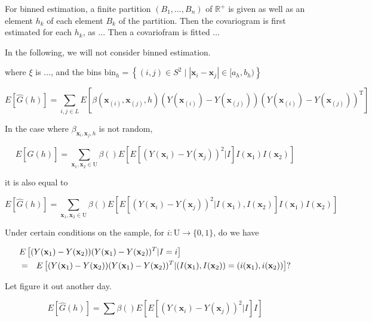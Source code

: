 \documentclass[12pt]{article}
\theoremstyle{definition}
\theoremstyle{remark}
\newcommand{\paramnuisance}{\xi}
\newcommand{\Sample}{S}
\newcommand{\Pop}{\mathrm{U}}
\newcommand{\position}{\mathbf{x}}
\newcommand{\Sampleindex}{L}
\begin{document}
For binned estimation, a finite partition $(B_1,\ldots,B_n)$ of $\mathbb{R}^+$ is given as well as an element $h_k$ of each element $B_k$ of the partition. 
Then the covariogram is first estimated for each $h_k$, as 
...
Then a covariofram is fitted 
...

In the following, we will not consider binned estimation.


where {\color{red} $\paramnuisance$ is ..., and the bins $\mathrm{bin}_h=\left\{(i,j)\in\Sample^2\mid \left|\position_i-\position_j\right|\in [a_h,b_h)\right\}$}

\begin{equation}
    E[\hat{G}(h)]=\sum_{i,j\in\Sampleindex}E\left[ \beta(\position_{(i)},\position_{(j)},h)(Y(\mathbf{x}_{(i)})-Y(\mathbf{x}_{(j)}))(Y(\mathbf{x}_{(i)})-Y(\mathbf{x}_{(j)}))^{\mathrm{T}}\right]
\end{equation}


In the case where $\beta_{\position_i,\position_j,h}$ is not random,

\begin{equation}
    E[\hat{G}(h)]=\sum_{\position_1,\position_2\in \Pop}{\beta()E\left[E\left[(Y(\mathbf{x}_{i})-Y(\mathbf{x}_{j}))^{2}|I\right]I(\position_1)I(\position_2)\right]}
\end{equation}

it is also equal to 


\begin{equation}
    E[\hat{G}(h)]=\sum_{\position_1,\position_2\in \Pop}{\beta()E\left[E\left[(Y(\mathbf{x}_{i})-Y(\mathbf{x}_{j}))^{2}|I(\position_1),I(\position_2)\right]I(\position_1)I(\position_2)\right]}
\end{equation}


Under certain conditions on the sample, for $i:\Pop\to\{0,1\}$, do we have 

\begin{eqnarray*}
\lefteqn{E\left[(Y(\mathbf{x}_{1})-Y(\mathbf{x}_{2}))(Y(\mathbf{x}_{1})-Y(\mathbf{x}_{2}))^T|I=i\right]}\\
&=&
E\left[(Y(\mathbf{x}_{1})-Y(\mathbf{x}_{2}))(Y(\mathbf{x}_{1})-Y(\mathbf{x}_{2}))^T|(I(\position_1),I(\position_2))=(i(\position_1),i(\position_2))\right]?\end{eqnarray*}

Let figure it out another day.


\begin{equation}
    E[\hat{G}(h)]=\sum{\beta()E\left[E\left[(Y(\mathbf{x}_{i})-Y(\mathbf{x}_{j}))^{2}|I\right]I\right]}
\end{equation}
\end{document}
